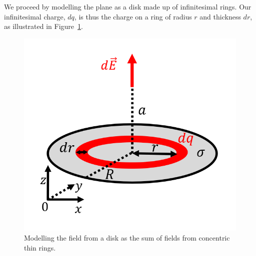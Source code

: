 \begin{framed}
\begin{framed}
We proceed by modelling the plane as a disk made up of infinitesimal rings. Our infinitesimal charge, $dq$, is thus the charge on a ring of radius $r$ and thickness $dr$, as illustrated in Figure~\ref{fig:chargesfields:disk}.

\begin{figure}[!htbp]
\centering
\includegraphics[width=0.3\linewidth]{files/disk-725ab7b22a1889b37e3080521f570aa5.png}
\caption[]{Modelling the field from a disk as the sum of fields from concentric thin rings.}
\label{fig:chargesfields:disk}
\end{figure}


\end{framed}
\end{framed}

